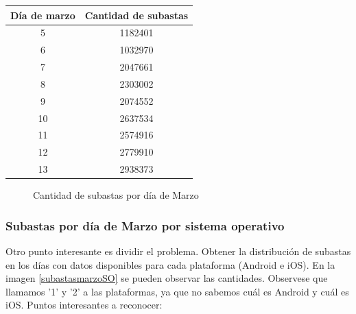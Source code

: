 \documentclass{article}
\newcommand\tab[1][1cm]{\hspace*{#1}}
\begin{document}
	\FloatBarrier
	\begin{center}
		\begin{tabular}{ |c|c| }
	    	\hline
        	Día de marzo & Cantidad de subastas \\
    	    \hline\hline
			5 & 1182401 \\
			\hline
			6 & 1032970 \\
			\hline
			7 & 2047661 \\
			\hline
			8 & 2303002 \\
			\hline
			9 & 2074552 \\
			\hline
			10 & 2637534 \\
			\hline
			11 & 2574916 \\
			\hline
			12 & 2779910 \\
			\hline
			13 & 2938373 \\
			\hline
		\end{tabular}
	\end{center}

		\begin{figure}
			\centering
		   		\caption{Cantidad de subastas por día de Marzo}
			   	\label{subastasmarzo}
		\end{figure}
	\FloatBarrier
			
	\subsubsection{Subastas por día de Marzo por sistema operativo}
	\tab Otro punto interesante es dividir el problema. Obtener la distribución de subastas en los días con datos disponibles para cada plataforma (Android e iOS). En la imagen \ref{subastasmarzoSO} se pueden observar las cantidades. Observese que llamamos '1' y '2' a las plataformas, ya que no sabemos cuál es Android y cuál es iOS.
	\tab Puntos interesantes a reconocer:
	
\end{document}
